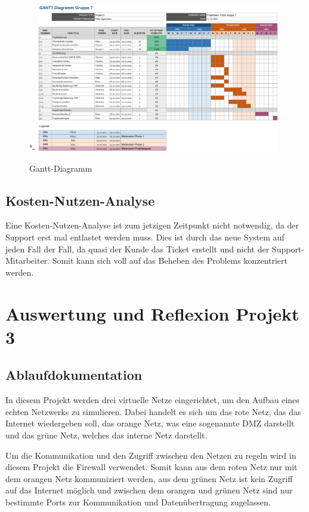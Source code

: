 \documentclass[a4paper,
    11pt,
    headings=small,
    ngerman,
    listof=totoc,
    numbers=noenddot]{scrreprt}[2021/11/13]
\begin{document}
\begin{figure}[htbp]"-
  \centering
  \includegraphics[width=0.95\textwidth]{data/Gantt.png}
  \caption{Gantt-Diagramm}
  \label{fig:GanttKlein}
\end{figure}



\section{Kosten-Nutzen-Analyse}

Eine Kosten-Nutzen-Analyse ist zum jetzigen Zeitpunkt nicht notwendig, da der Support erst mal entlastet werden muss. Dies ist durch das neue System auf jeden Fall der Fall, da quasi der Kunde das Ticket erstellt und nicht der Support-Mitarbeiter. Somit kann sich voll auf das Beheben des Problems konzentriert werden.




\chapter{Auswertung und Reflexion Projekt 3}



\section{Ablaufdokumentation}

In diesem Projekt werden drei virtuelle Netze eingerichtet, um den Aufbau eines echten Netzwerks zu simulieren. Dabei handelt es sich um das rote Netz, das das Internet wiedergeben soll, das orange Netz, was eine sogenannte \ac{DMZ} darstellt und das grüne Netz, welches das interne Netz darstellt.

Um die Kommunikation und den Zugriff zwischen den Netzen zu regeln wird in diesem Projekt die Firewall verwendet. Somit kann aus dem roten Netz nur mit dem orangen Netz kommuniziert werden, aus dem grünen Netz ist kein Zugriff auf das Internet möglich und zwischen dem orangen und grünen Netz sind nur bestimmte Ports zur Kommunikation und Datenübertragung zugelassen.
\end{document}
